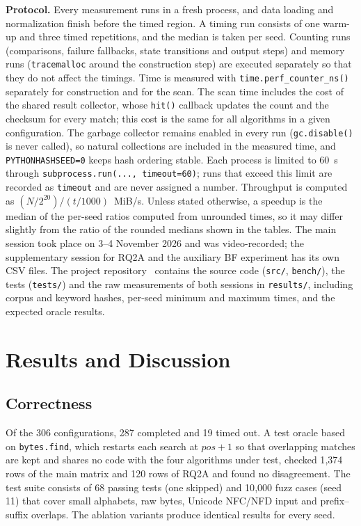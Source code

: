 \documentclass[conference]{IEEEtran}
\begin{document}
\textbf{Protocol.} Every measurement runs in a fresh process, and data loading and normalization finish before the timed region. A timing run consists of one warm-up and three timed repetitions, and the median is taken per seed. Counting runs (comparisons, failure fallbacks, state transitions and output steps) and memory runs (\texttt{tracemalloc} around the construction step) are executed separately so that they do not affect the timings. Time is measured with \texttt{time.perf\_counter\_ns()}~\cite{pydoc} separately for construction and for the scan. The scan time includes the cost of the shared result collector, whose \texttt{hit()} callback updates the count and the checksum for every match; this cost is the same for all algorithms in a given configuration. The garbage collector remains enabled in every run (\texttt{gc.disable()} is never called), so natural collections are included in the measured time, and \texttt{PYTHONHASHSEED=0} keeps hash ordering stable. Each process is limited to 60~s through \texttt{subprocess.run(..., timeout=60)}; runs that exceed this limit are recorded as \texttt{timeout} and are never assigned a number. Throughput is computed as $(N/2^{20})/(t/1000)$~MiB/s. Unless stated otherwise, a speedup is the median of the per-seed ratios computed from unrounded times, so it may differ slightly from the ratio of the rounded medians shown in the tables. The main session took place on 3--4 November 2026 and was video-recorded; the supplementary session for RQ2A and the auxiliary BF experiment has its own CSV files. The project repository~\cite{repo} contains the source code (\texttt{src/}, \texttt{bench/}), the tests (\texttt{tests/}) and the raw measurements of both sessions in \texttt{results/}, including corpus and keyword hashes, per-seed minimum and maximum times, and the expected oracle results.

\section{Results and Discussion}
\label{sec:results}
\subsection{Correctness}
Of the 306 configurations, 287 completed and 19 timed out. A test oracle based on \texttt{bytes.find}, which restarts each search at $pos+1$ so that overlapping matches are kept and shares no code with the four algorithms under test, checked 1{,}374 rows of the main matrix and 120 rows of RQ2A and found no disagreement. The test suite consists of 68 passing tests (one skipped) and 10{,}000 fuzz cases (seed 11) that cover small alphabets, raw bytes, Unicode NFC/NFD input and prefix--suffix overlaps. The ablation variants produce identical results for every seed.
\end{document}
